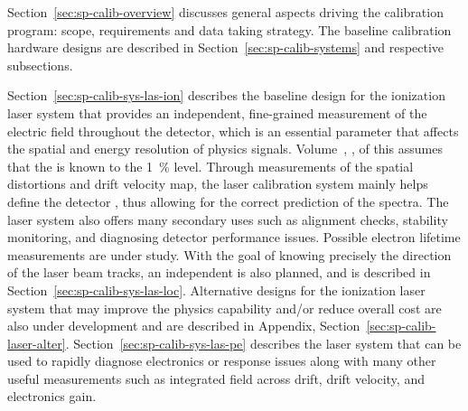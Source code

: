 Section~\ref{sec:sp-calib-overview} discusses general aspects driving the calibration program: scope, requirements and data taking strategy.
The baseline calibration hardware designs are described in Section~\ref{sec:sp-calib-systems} and respective subsections. 

Section~\ref{sec:sp-calib-sys-las-ion} describes the baseline design for the ionization laser system that provides an independent, fine-grained measurement of the electric field throughout the detector, which is an essential parameter that affects the spatial and energy resolution of physics signals. 
Volume~\volnumberphysics{}, \voltitlephysics{},  of this  
assumes that the  is known to the \SI{1}{\%} level. Through measurements of the spatial distortions and drift velocity map, the laser calibration system mainly helps define the detector , thus allowing for the correct prediction of the  spectra. The laser system also offers many secondary uses such as alignment checks, stability monitoring, and diagnosing detector performance issues. 
Possible electron lifetime measurements are under study. 
With the goal of knowing precisely the direction of the laser beam tracks, an independent 
is also planned, and is described in Section~\ref{sec:sp-calib-sys-las-loc}.
Alternative designs for the ionization laser system that may improve the physics capability and/or reduce overall cost are also under development and are described in Appendix, Section~\ref{sec:sp-calib-laser-alter}. %
Section~\ref{sec:sp-calib-sys-las-pe} describes the \phel laser system that can be used to rapidly diagnose electronics or  response issues along with many other useful measurements such as integrated field across drift, drift velocity, and electronics gain. 

